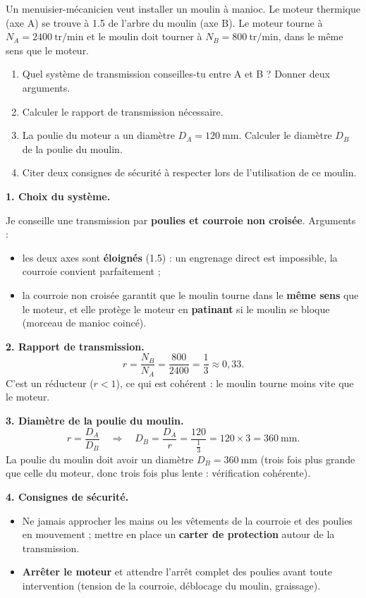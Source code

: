 \documentclass[11pt]{article}
\begin{document}
\begin{exoresolu}
Un menuisier-mécanicien veut installer un moulin à manioc. Le moteur thermique (axe A) se trouve à \SI{1,5}{} de l'arbre du moulin (axe B). Le moteur tourne à $N_A = \SI{2400}{\text{tr/min}}$ et le moulin doit tourner à $N_B = \SI{800}{\text{tr/min}}$, dans le même sens que le moteur.
\begin{enumerate}
\item Quel système de transmission conseilles-tu entre A et B ? Donner deux arguments.
\item Calculer le rapport de transmission nécessaire.
\item La poulie du moteur a un diamètre $D_A = \SI{120}{\text{mm}}$. Calculer le diamètre $D_B$ de la poulie du moulin.
\item Citer deux consignes de sécurité à respecter lors de l'utilisation de ce moulin.
\end{enumerate}
\tcblower
\textbf{1. Choix du système.}

Je conseille une transmission par \textbf{poulies et courroie non croisée}. Arguments :
\begin{itemize}
\item les deux axes sont \textbf{éloignés} (\SI{1,5}{}) : un engrenage direct est impossible, la courroie convient parfaitement ;
\item la courroie non croisée garantit que le moulin tourne dans le \textbf{même sens} que le moteur, et elle protège le moteur en \textbf{patinant} si le moulin se bloque (morceau de manioc coincé).
\end{itemize}

\textbf{2. Rapport de transmission.}
\[ r = \frac{N_B}{N_A} = \frac{800}{2400} = \frac{1}{3} \approx 0,33. \]
C'est un réducteur ($r < 1$), ce qui est cohérent : le moulin tourne moins vite que le moteur.

\textbf{3. Diamètre de la poulie du moulin.}
\[ r = \frac{D_A}{D_B} \quad \Rightarrow \quad D_B = \frac{D_A}{r} = \frac{120}{\frac{1}{3}} = 120 \times 3 = 360\ \text{mm}. \]
La poulie du moulin doit avoir un diamètre $D_B = \SI{360}{\text{mm}}$ (trois fois plus grande que celle du moteur, donc trois fois plus lente : vérification cohérente).

\textbf{4. Consignes de sécurité.}
\begin{itemize}
\item Ne jamais approcher les mains ou les vêtements de la courroie et des poulies en mouvement ; mettre en place un \textbf{carter de protection} autour de la transmission.
\item \textbf{Arrêter le moteur} et attendre l'arrêt complet des poulies avant toute intervention (tension de la courroie, déblocage du moulin, graissage).
\end{itemize}
\end{exoresolu}
\end{document}
